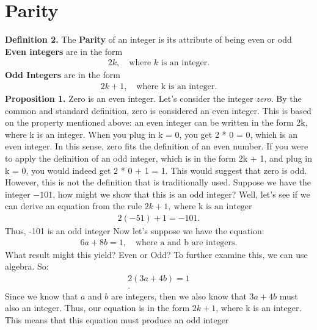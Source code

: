 \documentclass{report}
\begin{document}
    \section{\LARGE Parity}
    \bigbreak \noindent 
    \textbf{Definition 2.} The \textbf{Parity} of an integer is its attribute of being even or odd
    \bigbreak \noindent 
    \textbf{Even integers} are in the form
    \bigbreak \noindent 
    \begin{align*}
        2k, \quad \text{where $k $ is an integer}
    .\end{align*}
    \bigbreak \noindent 
    \textbf{Odd Integers} are in the form
    \bigbreak \noindent 
    \begin{align*}
        2k+1,\quad \text{where k is an integer}
    .\end{align*}
    \bigbreak \noindent 
    \textbf{Proposition 1.} Zero is an even integer. Let's consider the integer \textit{zero}. By the common and standard definition, zero is considered an even integer. This is based on the property mentioned above: an even integer can be written in the form 2k, where k is an integer. When you plug in k = 0, you get 2 * 0 = 0, which is an even integer. In this sense, zero fits the definition of an even number. 
    If you were to apply the definition of an odd integer, which is in the form 2k + 1, and plug in k = 0, you would indeed get 2 * 0 + 1 = 1. This would suggest that zero is odd. However, this is not the definition that is traditionally used.
    \bigbreak \noindent 
    Suppose we have the integer $-101$, how might we show that this is an odd integer? Well, let's see if we can derive an equation from the rule $2k+1,\ \text{where k is an integer}$
    \begin{align*}
        2(-51) + 1 = -101
    .\end{align*}
    \bigbreak \noindent 
    Thus, -101 is an odd integer
    \bigbreak \noindent 
    Now let's suppose we have the equation:
    \begin{align*}
        6a+8b = 1, \quad \text{where a and b are integers}
    .\end{align*}
    \bigbreak \noindent 
    What result might this yield? Even or Odd?
    \bigbreak \noindent 
    To further examine this, we can use algebra. So:
    \begin{align*}
        2(3a+4b) = 1 \\ 
    .\end{align*}
    \bigbreak \noindent 
    Since we know that $a $ and $b $ are integers, then we also know that $3a+4b$ must also an integer. Thus, our equation is in the form $2k+1$, where k is an integer. This means that this equation must produce an odd integer
\end{document}
